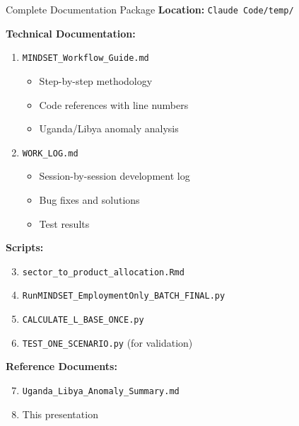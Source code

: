 \documentclass[10pt]{beamer}
\begin{document}

\begin{frame}{Complete Documentation Package}
\textbf{Location:} \texttt{Claude Code/temp/}

\vspace{0.3cm}

\textbf{Technical Documentation:}
\begin{enumerate}
    \item \texttt{MINDSET\_Workflow\_Guide.md}
    \begin{itemize}
        \item Step-by-step methodology
        \item Code references with line numbers
        \item Uganda/Libya anomaly analysis
    \end{itemize}

    \item \texttt{WORK\_LOG.md}
    \begin{itemize}
        \item Session-by-session development log
        \item Bug fixes and solutions
        \item Test results
    \end{itemize}
\end{enumerate}

\vspace{0.3cm}

\textbf{Scripts:}
\begin{enumerate}
    \setcounter{enumi}{2}
    \item \texttt{sector\_to\_product\_allocation.Rmd}
    \item \texttt{RunMINDSET\_EmploymentOnly\_BATCH\_FINAL.py}
    \item \texttt{CALCULATE\_L\_BASE\_ONCE.py}
    \item \texttt{TEST\_ONE\_SCENARIO.py} (for validation)
\end{enumerate}

\vspace{0.3cm}

\textbf{Reference Documents:}
\begin{enumerate}
    \setcounter{enumi}{6}
    \item \texttt{Uganda\_Libya\_Anomaly\_Summary.md}
    \item This presentation
\end{enumerate}

\end{frame}
\end{document}
